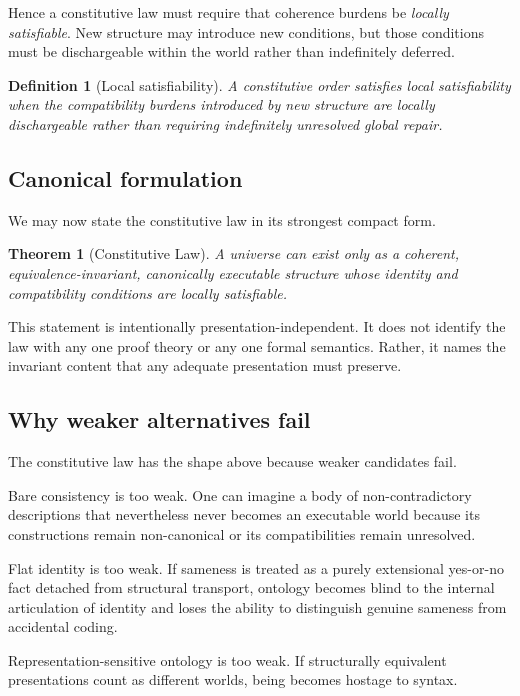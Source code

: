 \documentclass[11pt]{article}
\theoremstyle{foundation}
\newtheorem{theorem}{Theorem}
\newtheorem{definition}{Definition}
\begin{document}
Hence a constitutive law must require that coherence burdens be \emph{locally satisfiable}. New structure may introduce new conditions, but those conditions must be dischargeable within the world rather than indefinitely deferred.

\begin{definition}[Local satisfiability]
A constitutive order satisfies local satisfiability when the compatibility burdens introduced by new structure are locally dischargeable rather than requiring indefinitely unresolved global repair.
\end{definition}

\subsection{Canonical formulation}

We may now state the constitutive law in its strongest compact form.

\begin{theorem}[Constitutive Law]
A universe can exist only as a coherent, equivalence-invariant, canonically executable structure whose identity and compatibility conditions are locally satisfiable.
\end{theorem}

This statement is intentionally presentation-independent. It does not identify the law with any one proof theory or any one formal semantics. Rather, it names the invariant content that any adequate presentation must preserve.

\subsection{Why weaker alternatives fail}

The constitutive law has the shape above because weaker candidates fail.

Bare consistency is too weak. One can imagine a body of non-contradictory descriptions that nevertheless never becomes an executable world because its constructions remain non-canonical or its compatibilities remain unresolved.

Flat identity is too weak. If sameness is treated as a purely extensional yes-or-no fact detached from structural transport, ontology becomes blind to the internal articulation of identity and loses the ability to distinguish genuine sameness from accidental coding.

Representation-sensitive ontology is too weak. If structurally equivalent presentations count as different worlds, being becomes hostage to syntax.
\end{document}

